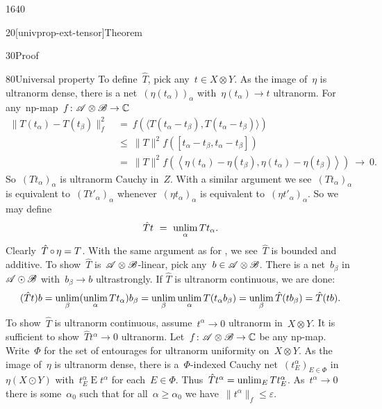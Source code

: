 \begin{parsec}{1640}
\begin{point}{20}[univprop-ext-tensor]{Theorem}
\begin{point}{30}{Proof}
\begin{point}{80}{Universal property}
To define~$\hat{T}$, pick any~$t \in X \otimes Y$.
As the image of~$\eta$ is ultranorm dense,
there is a net~$(\eta(t_\alpha))_\alpha$ with~$\eta(t_\alpha) \to t$ ultranorm.
For any~np-map~$f\colon \mathscr{A}\otimes \mathscr{B} \to \mathbb{C}$
\begin{align*}
    \|T(t_\alpha) - T(t_\beta) \|_f^2 
        &\ =\ f(\langle T(t_\alpha - t_\beta), T(t_\alpha - t_\beta) \rangle) \\
        & \ \leq \ \|T\|^2 f([t_\alpha-t_\beta, t_\alpha - t_\beta]) \\
        & \ = \ \|T\|^2 f(\left<\eta (t_\alpha)-\eta(t_\beta), \eta(t_\alpha) - \eta(t_\beta)\right>) \ \to\  0.
\end{align*}
So~$(T t_\alpha)_\alpha$ is ultranorm Cauchy in~$Z$.
With a similar argument we see~$(Tt_\alpha)_\alpha $
    is equivalent to~$ (T t'_\alpha)_\alpha$
whenever~$(\eta t_\alpha)_\alpha $ is equivalent
    to~$ (\eta t'_\alpha)_\alpha$.
So we may define
\begin{equation*}
\hat{T} t \ = \ \unlim_\alpha T t_\alpha.
\end{equation*}
Clearly~$\hat{T} \mathop{\circ} \eta = T$.
With the same argument as for ,
    we see~$\hat{T}$ is bounded and additive.
To show~$\hat{T}$ is~$\mathscr{A}\otimes \mathscr{B}$-linear,
    pick any~$b \in \mathscr{A} \otimes \mathscr{B}$.
There is a net~$b_\beta$ in~$\mathscr{A} \odot \mathscr{B}$
    with~$b_\beta \to b$ ultrastrongly.
If $\hat{T}$ is ultranorm continuous, we are done:
\begin{equation*}
    (\hat{T} t) b
    = \unlim_\beta (\unlim_\alpha T t_\alpha) b_\beta\\
     = \unlim_\beta \unlim_\alpha T (t_\alpha b_\beta) \\
     = \unlim_\beta \hat{T} (t b_\beta)\\
     = \hat{T} (tb).
\end{equation*}
To show~$\hat{T}$ is ultranorm continuous,
    assume~$t^\alpha \to 0$ ultranorm in~$X \otimes Y$.
It is sufficient to show~$\hat{T} t^\alpha \to 0$ ultranorm.
Let~$f\colon \mathscr{A}\otimes \mathscr{B} \to \mathbb{C}$ be any np-map.
Write~$\Phi$ for the set of entourages for ultranorm uniformity
    on~$X \otimes Y$.
As the image of~$\eta$ is ultranorm dense,
there is a~$\Phi$-indexed Cauchy net~$(t^\alpha_E)_{E \in \Phi}$ in
    $\eta (X \odot Y)$
    with~$t^\alpha_E \mathrel{E} t^\alpha$
    for each~$E \in \Phi$.
Thus~$\hat{T} t^\alpha = \unlim_E T t^\alpha_E$.
As~$t^\alpha \to 0$
    there is some~$\alpha_0$
    such that for all~$\alpha \geq \alpha_0$
    we have~$\|t^\alpha \|_f \leq \varepsilon$.

\end{point}
\end{point}
\end{point}
\end{parsec}

